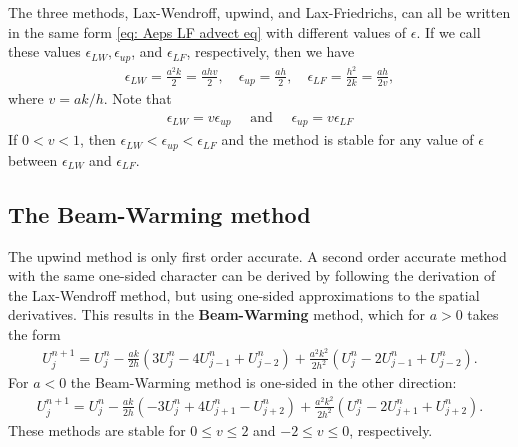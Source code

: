 The three methods, Lax-Wendroff, upwind, and Lax-Friedrichs, can all be written in the same form \eqref{eq: Aeps LF advect eq} with different values of $\epsilon$. If we call these values $\epsilon_{L W}, \epsilon_{u p}$, and $\epsilon_{L F}$, respectively, then we have
\begin{align*}
\epsilon_{L W}=\frac{a^2 k}{2}=\frac{a h v}{2}, \quad \epsilon_{u p}=\frac{a h}{2}, \quad \epsilon_{L F}=\frac{h^2}{2 k}=\frac{a h}{2 v},
\end{align*}
where $v=a k / h$. Note that
\begin{align*}
\epsilon_{L W}=v \epsilon_{u p} \quad \text { and } \quad \epsilon_{u p}=v \epsilon_{L F}
\end{align*}
If $0<v<1$, then $\epsilon_{L W}<\epsilon_{u p}<\epsilon_{L F}$ and the method is stable for any value of $\epsilon$ between $\epsilon_{L W}$ and $\epsilon_{L F}$. 

\subsection{The Beam-Warming method}
The upwind method is only first order accurate. A second order accurate method with the same one-sided character can be derived by following the derivation of the Lax-Wendroff method, but using one-sided approximations to the spatial derivatives. This results in the \textbf{Beam-Warming} method, which for $a>0$ takes the form
\begin{align*}
U_j^{n+1}=U_j^n-\frac{a k}{2 h}\left(3 U_j^n-4 U_{j-1}^n+U_{j-2}^n\right)+\frac{a^2 k^2}{2 h^2}\left(U_j^n-2 U_{j-1}^n+U_{j-2}^n\right) .
\end{align*}
For $a<0$ the Beam-Warming method is one-sided in the other direction:
\begin{align*}
U_j^{n+1}=U_j^n-\frac{a k}{2 h}\left(-3 U_j^n+4 U_{j+1}^n-U_{j+2}^n\right)+\frac{a^2 k^2}{2 h^2}\left(U_j^n-2 U_{j+1}^n+U_{j+2}^n\right) .
\end{align*}
These methods are stable for $0 \leq v \leq 2$ and $-2 \leq v \leq 0$, respectively.